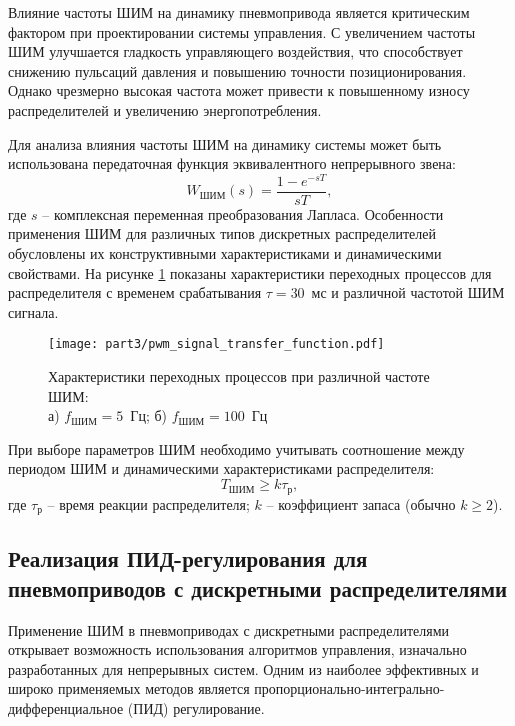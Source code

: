 Влияние частоты ШИМ на динамику пневмопривода является критическим фактором при
проектировании системы управления. С увеличением частоты ШИМ улучшается
гладкость управляющего воздействия, что способствует снижению пульсаций давления
и повышению точности позиционирования. Однако чрезмерно высокая частота может привести
к повышенному износу распределителей и увеличению энергопотребления.

Для анализа влияния частоты ШИМ на динамику системы может быть использована передаточная функция эквивалентного непрерывного звена:
\begin{equation}
	W_{\text{ШИМ}}(s) = \frac{1 - e^{-sT}}{sT},
\end{equation}
где $s$ -- комплексная переменная преобразования Лапласа.
Особенности применения ШИМ для различных типов дискретных
распределителей обусловлены их конструктивными характеристиками и
динамическими свойствами. На рисунке \ref{fig:ch3:pwm_valve_response} показаны
характеристики переходных процессов для распределителя с временем срабатывания $\tau = 30$~мс и различной
частотой ШИМ сигнала.

\begin{figure}[ht]
	\centering
	\texttt{[image: part3/pwm\_signal\_transfer\_function.pdf]}
	\caption{Характеристики переходных процессов при различной частоте ШИМ:\\
		а) $f_{\text{ШИМ}} = \num{5}$~Гц; б) $f_{\text{ШИМ}} = \num{100}$~Гц
	}
	\label{fig:ch3:pwm_valve_response}
\end{figure}

При выборе параметров ШИМ необходимо учитывать соотношение между
периодом ШИМ и динамическими характеристиками распределителя:
\begin{equation}
	T_{ШИМ} \geq k\tau_{\text{р}},
\end{equation}
где $\tau_{\text{р}}$ -- время реакции распределителя;
$k$ -- коэффициент запаса (обычно $k \geq 2$).

\subsection{Реализация ПИД-регулирования для пневмоприводов с дискретными распределителями}\label{subsec:ch3/sec2/sub2}

Применение ШИМ в пневмоприводах с дискретными распределителями открывает
возможность использования алгоритмов управления,
изначально разработанных для непрерывных систем.
Одним из наиболее эффективных и широко применяемых методов является
пропорционально-интегрально-дифференциальное (ПИД) регулирование.

